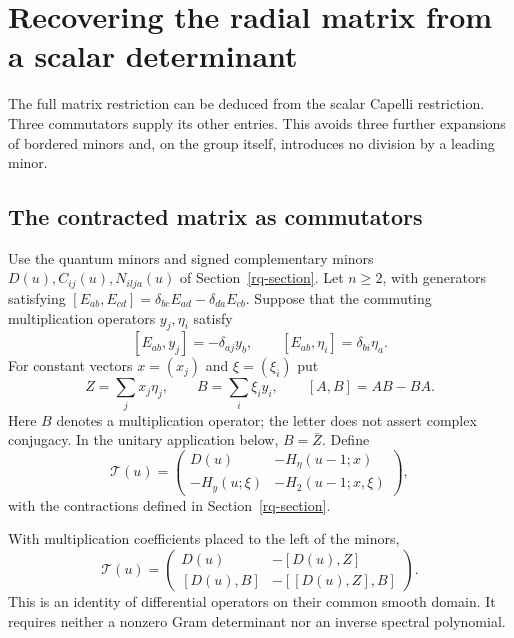 \section{Recovering the radial matrix from a scalar determinant}
\label{cm-section}

The full matrix restriction can be deduced from the scalar Capelli
restriction.  Three commutators supply its other entries.  This avoids
three further expansions of bordered minors and, on the group itself,
introduces no division by a leading minor.

\subsection{The contracted matrix as commutators}

Use the quantum minors and signed complementary minors
$D(u),C_{ij}(u),N_{ilja}(u)$ of Section~\ref{rq-section}.
Let $n\geq2$, with generators satisfying
$[E_{ab},E_{cd}]=\delta_{bc}E_{ad}-\delta_{da}E_{cb}$.
Suppose that the commuting multiplication operators
$y_j,\eta_i$ satisfy
\[
 [E_{ab},y_j]=-\delta_{aj}y_b,
 \qquad [E_{ab},\eta_i]=\delta_{bi}\eta_a.
\]
For constant vectors $x=(x_j)$ and $\xi=(\xi_i)$ put
\[
 Z=\sum_j x_j\eta_j,\qquad B=\sum_i\xi_i y_i,
 \qquad [A,B]=AB-BA.
\]
Here $B$ denotes a multiplication operator; the letter does not
assert complex conjugacy.  In the unitary application below, $B=\bar Z$.
Define
\[
 \mathcal T(u)=
 \begin{pmatrix}
 D(u)&-H_\eta(u-1;x)\\
 -H_y(u;\xi)&-H_2(u-1;x,\xi)
 \end{pmatrix},
\]
with the contractions defined in Section~\ref{rq-section}.

\begin{theorem}\label{cm-commutator-matrix}
With multiplication coefficients placed to the left of the minors,
\begin{equation}\label{cm-four-commutators}
 \mathcal T(u)=
 \begin{pmatrix}
 D(u)&-[D(u),Z]\\
 {[D(u),B]}&-[[D(u),Z],B]
 \end{pmatrix}.
\end{equation}
This is an identity of differential operators on their common smooth
domain.  It requires neither a nonzero Gram determinant nor an inverse
spectral polynomial.
\end{theorem}

